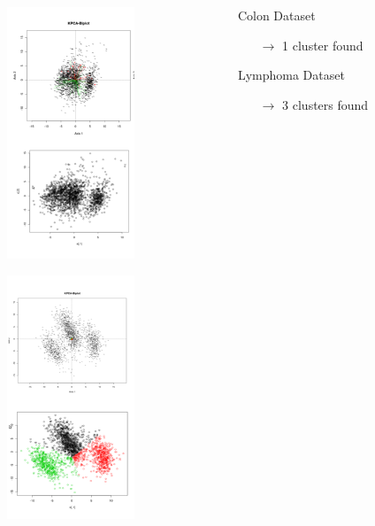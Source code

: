 \documentclass[serif]{beamer}
\begin{document}
	\begin{frame}
		\begin{columns}
			\begin{column}{2in}
				\only<1>
				{
					\begin{center}
						\includegraphics[width=1.5in]{images/JUMP/COLON}
					\end{center}
				}
				{
					\begin{center}
						\includegraphics[width=1.5in]{images/JUMP/LYMPHOMA}
					\end{center}
				}
			\end{column}
			\begin{column}{2in}
				\only<1>
				{
					\begin{block}{Colon Dataset}
						\begin{itemize}
							\item[$\rightarrow$] 1 cluster found
						\end{itemize}
					\end{block}
				}
				\only<2>
				{
					\begin{block}{Lymphoma Dataset}
						\begin{itemize}
							\item[$\rightarrow$] 3 clusters found
						\end{itemize}
					\end{block}
				}
			\end{column}
		\end{columns}
	\end{frame}
	
\end{document}
